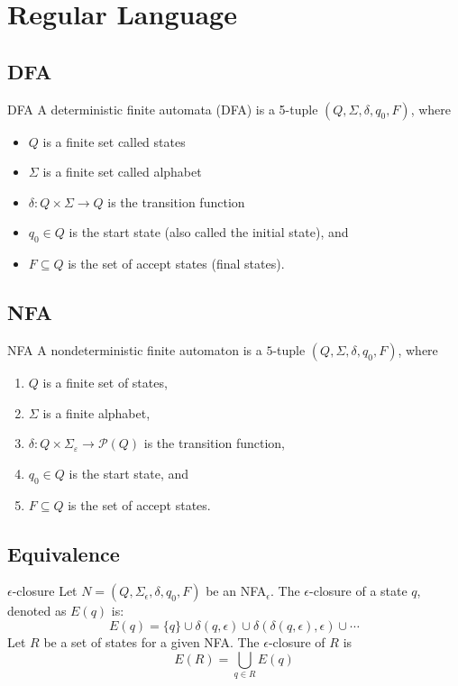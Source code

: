 \section{Regular Language}

\subsection{DFA}
\begin{Definition}{DFA}{}
	A deterministic finite automata (DFA) is a 5-tuple $(Q, \Sigma, \delta, q_0, F)$, where
	\begin{itemize}
		\item $Q$ is a finite set called states
		\item $\Sigma$ is a finite set called alphabet
		\item $\delta: Q \times \Sigma \rightarrow Q$ is the transition function
		\item $q_0 \in Q$ is the start state (also called the initial state), and
		\item $F \subseteq Q$ is the set of accept states (final states).
	\end{itemize}
\end{Definition}

\subsection{NFA}
\begin{Definition}{NFA}{}
	A nondeterministic finite automaton is a $5$-tuple $\left(Q, \Sigma, \delta, q_0, F\right)$, where
	\begin{enumerate}
		\item $Q$ is a finite set of states,
		\item $\Sigma$ is a finite alphabet,
		\item $\delta: Q \times \Sigma_{\varepsilon} \longrightarrow \mathcal{P}(Q)$ is the transition function,
		\item $q_0 \in Q$ is the start state, and
		\item $F \subseteq Q$ is the set of accept states.
	\end{enumerate}
\end{Definition}

\subsection{Equivalence}
\begin{Definition}{$\epsilon$-closure}{}
	Let $N = (Q, \Sigma_{\epsilon}, \delta, q_0, F)$ be an NFA$_{\epsilon}$.
	The $\epsilon$-closure of a state $q$, denoted as $E(q)$ is:
	\[
		E(q) = \{ q \} \cup \delta(q, \epsilon) \cup \delta(\delta(q, \epsilon), \epsilon) \cup \cdots
	\]
	Let $R$ be a set of states for a given NFA. The $\epsilon$-closure of $R$ is
	\[
		E(R) = \bigcup_{q \in R} E(q)
	\]
\end{Definition}